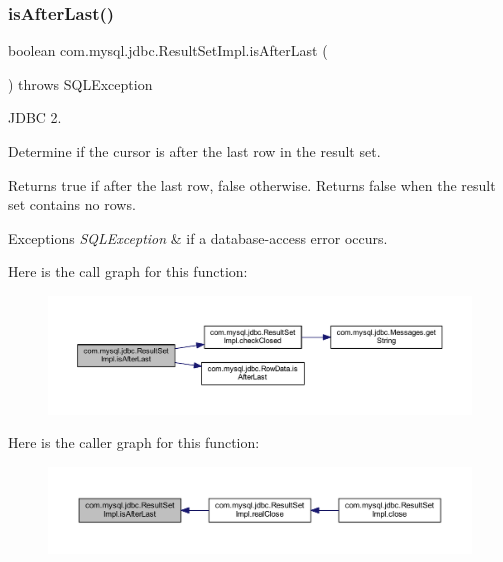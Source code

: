 \subsubsection{\texorpdfstring{is\+After\+Last()}{isAfterLast()}}
{\footnotesize\ttfamily boolean com.\+mysql.\+jdbc.\+Result\+Set\+Impl.\+is\+After\+Last (\begin{DoxyParamCaption}{ }\end{DoxyParamCaption}) throws S\+Q\+L\+Exception}

J\+D\+BC 2.

Determine if the cursor is after the last row in the result set. 

\begin{DoxyReturn}{Returns}
true if after the last row, false otherwise. Returns false when the result set contains no rows.
\end{DoxyReturn}

\begin{DoxyExceptions}{Exceptions}
{\em S\+Q\+L\+Exception} & if a database-\/access error occurs. \\
\hline
\end{DoxyExceptions}
Here is the call graph for this function\+:
\nopagebreak
\begin{figure}[H]
\begin{center}
\leavevmode
\includegraphics[width=350pt]{classcom_1_1mysql_1_1jdbc_1_1_result_set_impl_aad87b9e19492ef903b73d29a98b32e7e_cgraph}
\end{center}
\end{figure}
Here is the caller graph for this function\+:
\nopagebreak
\begin{figure}[H]
\begin{center}
\leavevmode
\includegraphics[width=350pt]{classcom_1_1mysql_1_1jdbc_1_1_result_set_impl_aad87b9e19492ef903b73d29a98b32e7e_icgraph}
\end{center}
\end{figure}
\mbox{\label{classcom_1_1mysql_1_1jdbc_1_1_result_set_impl_a4bcb82a7e4b69b3662d741862ccca1e6}} 
